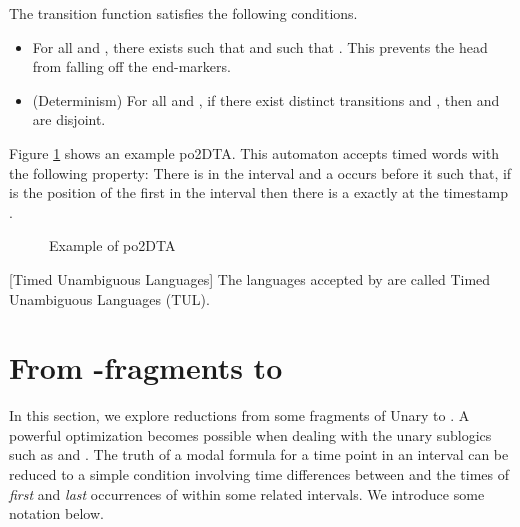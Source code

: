 \documentclass{llncs}
\newcommand{\mitlfp}{\mbox{}}
\newcommand{\bmitlfp}{\mbox{}}
\newcommand{\potdta}{\mbox{}}
\newcommand{\mitlfpinf}{\mbox{}}
\newcommand{\mitlfpb}{\bmitlfp}
\begin{document}
The transition function satisfies the following conditions.
\begin{itemize}
\item For all  and , there exists  such that  and  such that  . This prevents the head from falling off the end-markers. 
\item (Determinism) For all  and , if there exist distinct transitions 
 and , then  and  are disjoint.
\end{itemize}

\begin{example}
\label{exam:potdta}
Figure \ref{exam:autex1} shows an example po2DTA. 
This automaton accepts timed words with the following property: 
There is   in the interval  and a  occurs before it such that, if  is the position of 
the first  in the 
interval  then there is a  exactly at the timestamp .
\end{example}
\begin{figure}
\caption{Example of po2DTA}
\label{exam:autex1}
\end{figure}


\begin{definition}{[Timed Unambiguous Languages]}
The languages accepted by \potdta\/ are called Timed Unambiguous Languages (TUL).
\end{definition}



\section{From \mitlfp-fragments to \potdta}
In this section, we explore reductions from some fragments of Unary  to \potdta. A powerful optimization becomes possible when dealing with the unary sublogics such as \mitlfpb\/ and \mitlfpinf. The truth of a modal formula  for a time point  in an interval  can be reduced to a simple condition involving time differences between  and the times of \emph{first} and \emph{last} occurrences of  within some  related intervals. We introduce some notation below.
\end{document}
